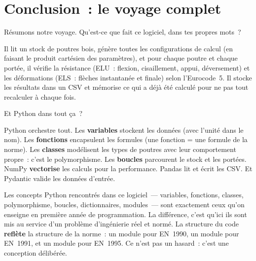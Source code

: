 \chapter*{Conclusion~: le voyage complet}

\begin{maitre}
R\'esumons notre voyage. Qu'est-ce que fait ce logiciel,
dans tes propres mots~?
\end{maitre}

\begin{apprenti}
Il lit un stock de poutres bois, g\'en\`ere toutes les configurations
de calcul (en faisant le produit cart\'esien des param\`etres),
et pour chaque poutre et chaque port\'ee, il v\'erifie la r\'esistance
(ELU~: flexion, cisaillement, appui, d\'eversement) et les d\'eformations
(ELS~: fl\`eches instantan\'ee et finale) selon l'Eurocode~5.
Il stocke les r\'esultats dans un CSV et m\'emorise ce qui a d\'ej\`a
\'et\'e calcul\'e pour ne pas tout recalculer \`a chaque fois.
\end{apprenti}

\begin{maitre}
Et Python dans tout \c{c}a~?
\end{maitre}

\begin{apprenti}
Python orchestre tout. Les \textbf{variables} stockent les donn\'ees
(avec l'unit\'e dans le nom). Les \textbf{fonctions} encapsulent les formules
(une fonction = une formule de la norme). Les \textbf{classes} mod\'elisent
les types de poutres avec leur comportement propre~: c'est le polymorphisme.
Les \textbf{boucles} parcourent le stock et les port\'ees. NumPy
\textbf{vectorise} les calculs pour la performance. Pandas lit et \'ecrit
les CSV. Et Pydantic valide les donn\'ees d'entr\'ee.
\end{apprenti}

\begin{important}
Les concepts Python rencontr\'es dans ce logiciel~--- variables, fonctions,
classes, polymorphisme, boucles, dictionnaires, modules~--- sont exactement
ceux qu'on enseigne en premi\`ere ann\'ee de programmation.
La diff\'erence, c'est qu'ici ils sont mis au service d'un probl\`eme
d'ing\'enierie r\'eel et norm\'e.
La structure du code \textbf{refl\`ete} la structure de la norme~:
un module  pour EN~1990, un module  pour EN~1991,
et un module  pour EN~1995.
Ce n'est pas un hasard~: c'est une conception d\'elib\'er\'ee.
\end{important}

